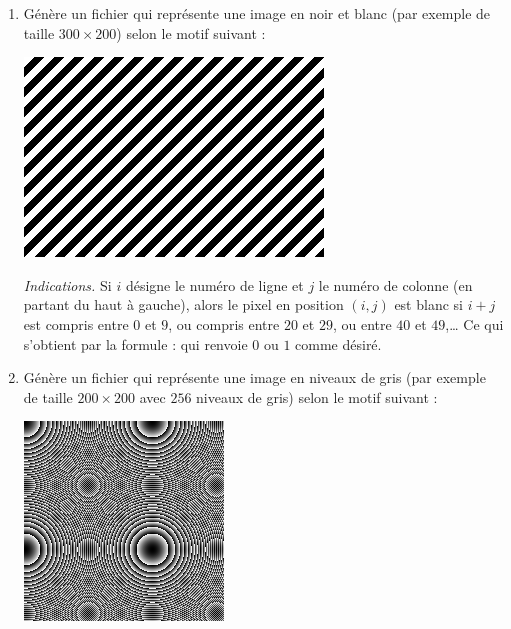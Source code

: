 \documentclass[11pt,class=report,crop=false]{standalone}
\begin{document}
\begin{activite}



\begin{enumerate}
  \item Génère un fichier  qui représente une image en noir et blanc (par exemple de taille $300 \times 200$) selon le motif suivant :
\begin{center}
\includegraphics[scale=\myscale,scale=0.5]{ecran-image_nb}
\end{center}   

\emph{Indications.} Si $i$ désigne le numéro de ligne et $j$ le numéro de colonne (en partant du haut à gauche), alors le pixel en position $(i,j)$ est blanc si $i+j$ est compris entre $0$ et $9$, ou compris entre $20$ et $29$, ou entre $40$ et $49$,\ldots{} Ce qui s'obtient par la formule :
qui renvoie $0$ ou $1$ comme désiré.

  \item  Génère un fichier  qui représente une image en niveaux de gris (par exemple de taille $200 \times 200$ avec $256$ niveaux de gris) selon le motif suivant :
\begin{center}
\includegraphics[scale=\myscale,scale=0.7]{ecran-image_gris}
\end{center}   


\end{enumerate}
\end{activite}
\end{document}
